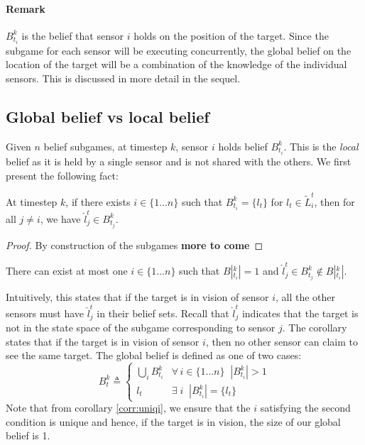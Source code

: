 \paragraph*{Remark}$B^k_{t_i}$ is the belief that sensor $i$ holds on the position of the target. Since the subgame for each sensor will be executing concurrently, the global belief on the location of the target will be a combination of the knowledge of the individual sensors. This is discussed in more detail in the sequel.

\subsection{Global belief vs local belief}
Given $n$ belief subgames, at timestep $k$, sensor $i$ holds belief $B^k_{t_i}$. This is the \emph{local} belief as it is held by a single sensor and is not shared with the others. We first present the following fact: 
\begin{theorem} 
At timestep $k$, if there exists $i\in \{1\dots n\}$ such that $B^k_{t_i} = \{l_t\}$ for $l_t \in \widetilde{L}_i^t$, then for all $j \neq i$, we have $\hat{l}^t_j \in B^k_{t_j}$.
\end{theorem}
\begin{proof}
By construction of the subgames \textbf{more to come}
\end{proof}
\begin{corollary}\label{corr:uniqi}
There can exist at most one $i\in \{1\dots n\}$ such that $B|^k_{t_i}| = 1$ and $\hat{l}^t_j \in B^k_{t_j} \notin B|^k_{t_i}|$.
\end{corollary}
Intuitively, this states that if the target is in vision of sensor $i$, all the other sensors must have $\hat{l}^t_j$ in their belief sets. Recall that $\hat{l}^t_j$ indicates that the target is not in the state space of the subgame corresponding to sensor $j$. The corollary states that if the target is in vision of sensor $i$, then no other sensor can claim to see the same target. 
The global belief is defined as one of two cases:
\[B^k_t \triangleq \begin{cases}
\bigcup_{i}B^k_{t_i} & \forall \, i \in \{1\dots n\} \;\; |B^k_{t_i}| > 1\\
l_t & \exists \; i \;\; |B^k_{t_i}| = \{l_t\} 
\end{cases}
\]
Note that from corollary \ref{corr:uniqi}, we ensure that the $i$ satisfying the second condition is unique and hence, if the target is in vision, the size of our global belief is 1. 
